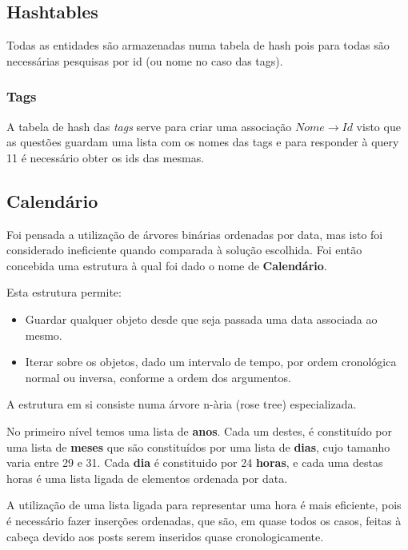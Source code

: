 \documentclass[10pt,a4paper]{article}
\begin{document}
    \subsection{Hashtables}
        Todas as entidades são armazenadas numa tabela de hash pois para todas
        são necessárias pesquisas por id (ou nome no caso das tags).

        \subsubsection{Tags}
        A tabela de hash das \textit{tags} serve para criar uma associação
        $Nome \to Id$ visto que as questões guardam uma lista com os nomes das
        tags e para responder à query 11 é necessário obter os ids das mesmas.

    \subsection{Calendário}
        Foi pensada a utilização de árvores binárias ordenadas por data,
        mas isto foi considerado ineficiente quando comparada à solução
        escolhida. Foi então concebida uma estrutura à qual foi dado o nome
        de \textbf{Calendário}.

        Esta estrutura permite:
        \begin{itemize}
                \item Guardar qualquer objeto desde que seja
                      passada uma data associada ao mesmo.
                \item Iterar sobre os objetos, dado um intervalo de tempo,
                      por ordem cronológica normal ou inversa, conforme a
                      ordem dos argumentos.
        \end{itemize}
        
        A estrutura em si consiste numa árvore n-ària (rose tree) especializada.
        
        No primeiro nível temos uma lista de \textbf{anos}. Cada um destes,
        é constituído por uma lista de \textbf{meses} que são constituídos por
        uma lista de \textbf{dias}, cujo tamanho varia entre 29 e 31. Cada 
        \textbf{dia} é constituido por 24 \textbf{horas}, e cada uma destas horas
        é uma lista ligada de elementos ordenada por data.

        A utilização de uma lista ligada para representar uma hora é mais
        eficiente, pois é necessário fazer inserções ordenadas, que são, em quase
        todos os casos, feitas à cabeça devido aos posts serem inseridos quase
        cronologicamente.
        
\end{document}
